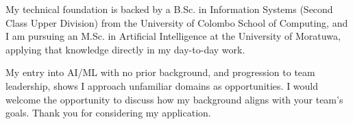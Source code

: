 \documentclass[11pt]{article}
\begin{document}
My technical foundation is backed by a B.Sc. in Information Systems (Second Class Upper Division) from the University of Colombo School of Computing, and I am pursuing an M.Sc. in Artificial Intelligence at the University of Moratuwa, applying that knowledge directly in my day-to-day work.

My entry into AI/ML with no prior background, and progression to team leadership, shows I approach unfamiliar domains as opportunities. I would welcome the opportunity to discuss how my background aligns with your team's goals. Thank you for considering my application.

\end{document}
